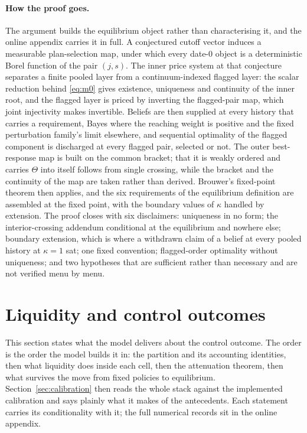 \documentclass[11pt]{article}
\makeatletter
\newcommand{\compatlabel}[2]{\begingroup\phantomsection\def\@currentlabel{#1}\label{#2}\endgroup}
\makeatother
\begin{document}
\paragraph{How the proof goes.} The argument builds the equilibrium object rather than
characterising it, and the online appendix carries it in full. A conjectured cutoff vector induces a
measurable plan-selection map, under which every date-$0$ object is a deterministic Borel function of
the pair $(j,s)$. The inner price system at that conjecture separates a finite pooled layer from a
continuum-indexed flagged layer: the scalar reduction behind \eqref{eq:m0} gives existence,
uniqueness and continuity of the inner root, and the flagged layer is priced by inverting the
flagged-pair map, which joint injectivity makes invertible. Beliefs are then supplied at every
history that carries a requirement, Bayes where the reaching weight is positive and the fixed
perturbation family's limit elsewhere, and sequential optimality of the flagged component is
discharged at every flagged pair, selected or not. The outer best-response map is built on the
common bracket; that it is weakly ordered and carries $\Theta$ into itself follows from single
crossing, while the bracket and the continuity of the map are taken rather than derived. Brouwer's
fixed-point theorem then applies, and the six requirements of the equilibrium definition are
assembled at the fixed point, with the boundary values of $\kappa$ handled by extension. The proof
closes with six disclaimers: uniqueness in no form; the interior-crossing addendum conditional at
the equilibrium and nowhere else; boundary extension, which is where a withdrawn claim of a belief
at every pooled history at $\kappa=1$ sat; one fixed convention; flagged-order optimality without
uniqueness; and two hypotheses that are sufficient rather than necessary and are not verified menu
by menu.\compatlabel{1}{prop:P1}

\section{Liquidity and control outcomes}
\label{sec:outcomes}

This section states what the model delivers about the control outcome. The order is the order the
model builds it in: the partition and its accounting identities, then what liquidity does inside
each cell, then the attenuation theorem, then what survives the move from fixed policies to
equilibrium. Section~\ref{sec:calibration} then reads the whole stack against the implemented
calibration and says plainly what it makes of the antecedents. Each statement carries its
conditionality with it; the full numerical records sit in the online appendix.
\end{document}
